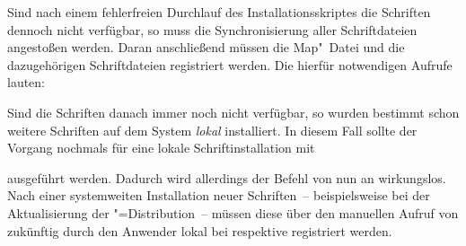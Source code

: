 Sind nach einem fehlerfreien Durchlauf des Installationsskriptes die Schriften 
dennoch nicht verfügbar, so muss die Synchronisierung aller Schriftdateien 
angestoßen werden. Daran anschließend müssen die Map"~Datei und die 
dazugehörigen Schriftdateien registriert werden. Die hierfür notwendigen 
Aufrufe lauten:
%
\begin{quoting}
\newline
{}\newline
{}
\end{quoting}
%
Sind die Schriften danach immer noch nicht verfügbar, so wurden bestimmt schon 
weitere Schriften auf dem System \emph{lokal} installiert. In diesem Fall 
sollte der Vorgang nochmals für eine lokale Schriftinstallation mit 
%
\begin{quoting}
\newline
{}\newline
{}
\end{quoting}
%
ausgeführt werden. Dadurch wird allerdings der Befehl  von nun 
an wirkungslos. Nach einer systemweiten Installation neuer Schriften~-- 
beispielsweise bei der Aktualisierung der "=Distribution~-- 
müssen diese über den manuellen Aufruf von  zukünftig durch den 
Anwender lokal bei  respektive 
 registriert werden.




